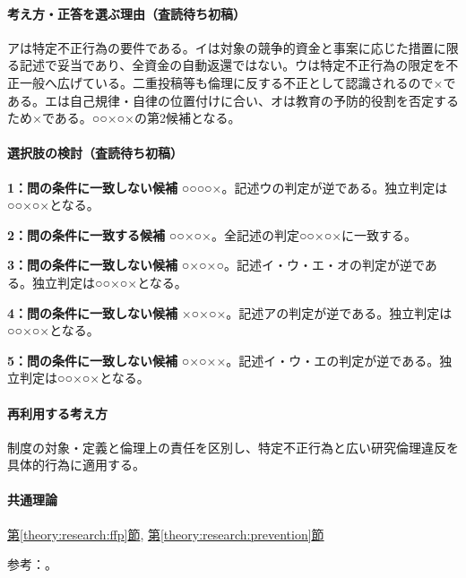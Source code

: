 \paragraph{考え方・正答を選ぶ理由（査読待ち初稿）} アは特定不正行為の要件である。イは対象の競争的資金と事案に応じた措置に限る記述で妥当であり、全資金の自動返還ではない。ウは特定不正行為の限定を不正一般へ広げている。二重投稿等も倫理に反する不正として認識されるので×である。エは自己規律・自律の位置付けに合い、オは教育の予防的役割を否定するため×である。○○×○×の第2候補となる。

\paragraph{選択肢の検討（査読待ち初稿）}\mbox{}\par

\noindent\textbf{1：問の条件に一致しない候補} ○○○○×。記述ウの判定が逆である。独立判定は○○×○×となる。\par

\noindent\textbf{2：問の条件に一致する候補} ○○×○×。全記述の判定○○×○×に一致する。\par

\noindent\textbf{3：問の条件に一致しない候補} ○×○×○。記述イ・ウ・エ・オの判定が逆である。独立判定は○○×○×となる。\par

\noindent\textbf{4：問の条件に一致しない候補} ×○×○×。記述アの判定が逆である。独立判定は○○×○×となる。\par

\noindent\textbf{5：問の条件に一致しない候補} ○×○××。記述イ・ウ・エの判定が逆である。独立判定は○○×○×となる。\par

\paragraph{再利用する考え方} 制度の対象・定義と倫理上の責任を区別し、特定不正行為と広い研究倫理違反を具体的行為に適用する。

\paragraph{共通理論} \hyperref[theory:research:ffp]{第\ref*{theory:research:ffp}節}, \hyperref[theory:research:prevention]{第\ref*{theory:research:prevention}節}

\par 参考：\cite{mext_misconduct2014}。

